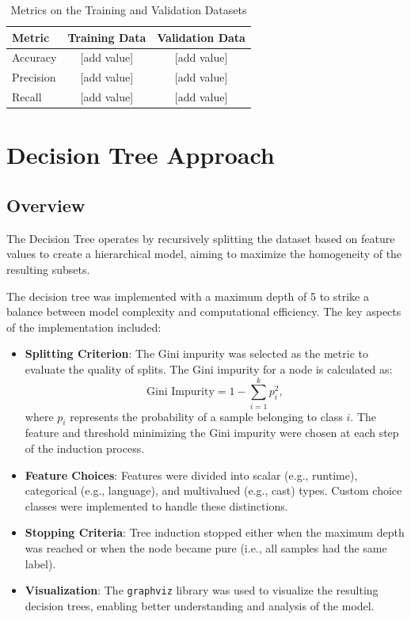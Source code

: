 \documentclass[a3paper,12pt]{article}
\begin{document}
\begin{table}[h]
    \centering
    \begin{tabular}{|l|c|c|}
        \hline
        \textbf{Metric} & \textbf{Training Data} & \textbf{Validation Data} \\ \hline
        Accuracy        & [add value]         & [add value]           \\ \hline
        Precision       & [add value]         & [add value]           \\ \hline
        Recall          & [add value]         & [add value]           \\ \hline
    \end{tabular}
    \caption{Metrics on the Training and Validation Datasets}
    \label{tab:metrics}
\end{table}

\section{Decision Tree Approach}
\subsection{Overview}

The Decision Tree operates by recursively splitting the dataset based on feature values to create
a hierarchical model, aiming to maximize the homogeneity of the resulting subsets.

The decision tree was implemented with a maximum depth of 5 to strike a balance between model
complexity and computational efficiency.
The key aspects of the implementation included:

\begin{itemize}

 \item \textbf{Splitting Criterion}:
    The Gini impurity was selected as the metric to evaluate the quality of splits. The Gini impurity for a node is calculated as:
    \begin{equation}
    \text{Gini Impurity} = 1 - \sum_{i=1}^{k} p_i^2,
    \end{equation}
    where \(p_i\) represents the probability of a sample belonging to class \(i\). The feature and threshold minimizing the Gini impurity were chosen at each step of the induction process.
    \item \textbf{Feature Choices}: Features were divided into scalar (e.g., runtime), categorical (e.g., language), and multivalued (e.g., cast) types. Custom choice classes were implemented to handle these distinctions.
    \item \textbf{Stopping Criteria}: Tree induction stopped either when the maximum depth was reached or when the node became pure (i.e., all samples had the same label).
    \item \textbf{Visualization}: The \texttt{graphviz} library was used to visualize the resulting decision trees, enabling better understanding and analysis of the model.
\end{itemize}
\end{document}

